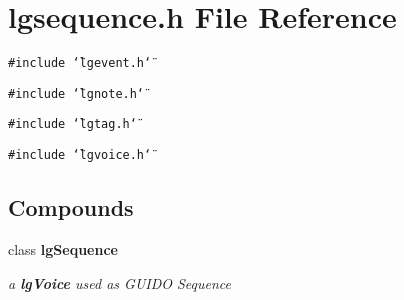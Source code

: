 \section{lgsequence.h File Reference}
\label{lgsequence_8h}
{\tt \#include \char`\"{}lgevent.h\char`\"{}}\par
{\tt \#include \char`\"{}lgnote.h\char`\"{}}\par
{\tt \#include \char`\"{}lgtag.h\char`\"{}}\par
{\tt \#include \char`\"{}lgvoice.h\char`\"{}}\par
\subsection*{Compounds}
\begin{CompactItemize}
\item 
class {\bf lg\-Sequence}
\begin{CompactList}\small\item\em a {\bf lg\-Voice} used as GUIDO Sequence \item\end{CompactList}\end{CompactItemize}
